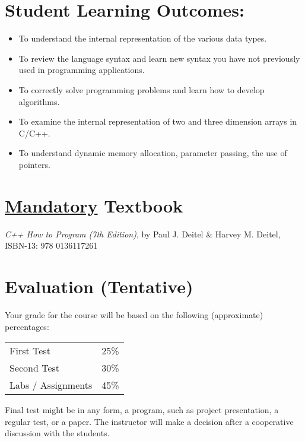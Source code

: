 \documentclass[11pt]{article}
\begin{document}
\section*{Student Learning Outcomes:}
\label{sec-4}


\begin{itemize}
\item To understand the internal representation of the various data types.
\item To review the language syntax and learn new syntax you have not previously used in programming applications.
\item To correctly solve programming problems and learn how to develop algorithms.
\item To examine the internal representation of two and three dimension arrays in C/C++.
\item To understand dynamic memory allocation, parameter passing, the use of pointers.
\end{itemize}
\section*{\underline{Mandatory} Textbook}
\label{sec-5}

\emph{C++ How to Program (7th Edition)}, by Paul J. Deitel \& Harvey M. Deitel, ISBN-13: 978 0136117261
\section*{Evaluation (Tentative)}
\label{sec-6}

Your grade for the course will be based on the following (approximate) percentages:


\begin{center}
\begin{tabular*}{0.9\textwidth}{ll}
 First Test          &  25\%  \\
 Second Test         &  30\%  \\
 Labs / Assignments  &  45\%  \\
\end{tabular*}
\end{center}



Final test might be in any form, a program, such as project
presentation, a regular test, or a paper. The instructor will make a
decision after a cooperative discussion with the students.
\end{document}
